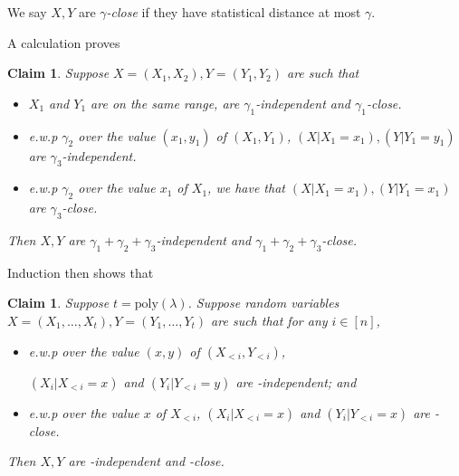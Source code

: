 \documentclass[11pt]{article}
\numberwithin{equation}{section} %
\numberwithin{figure}{section} %
\newtheorem{claim}[thm]{Claim}
\newcommand{\set}[1]{\ensuremath{\left\{#1\right\}}\xspace}
\newcommand{\poly}{\ensuremath{\mathrm{poly}(\lambda)}\xspace}
\begin{document}
We say $X,Y$ are \emph{$\gamma$-close} if they have statistical distance at most $\gamma$.

A calculation proves
\begin{claim}\label{clm:close_to_ind}
 Suppose $X=(X_1,X_2), Y=(Y_1,Y_2)$ are such that 
 \begin{itemize}
 \item $X_1$ and $Y_1$ are on the same range, are $\gamma_1$-independent and $\gamma_1$-close.
  \item 
 e.w.p $\gamma_2$ over the value $(x_1,y_1)$ of $(X_1,Y_1)$, $(X|X_1=x_1), (Y|Y_1 = y_1)$ are $\gamma_3$-independent.
 \item e.w.p $\gamma_2$ over the value $x_1$ of $X_1$, we have that $(X|X_1=x_1), (Y|Y_1=x_1)$ are $\gamma_3$-close.
 \end{itemize}

 Then $X,Y$ are $\gamma_1+\gamma_2+\gamma_3$-independent and $\gamma_1+\gamma_2+\gamma_3$-close.
 \end{claim}

 Induction then shows that
 \begin{claim}\label{clm:neg_close_to_ind}
  Suppose $t=\poly$. Suppose random variables $X=(X_1,\ldots,X_t),Y=(Y_1,\ldots,Y_t)$ are such that
  for any $i\in [n]$,
  
  \begin{itemize}
   \item 
e.w.p \negl over the value $(x,y)$ of $(X_{<i},Y_{<i})$,

  $(X_i|X_{<i}=x)$ and $(Y_i|Y_{<i}=y)$ are \negl-independent;
  and
  \item e.w.p \negl over the value $x$ of $X_{<i}$,
  $(X_i|X_{<i}=x)$ and $(Y_i|Y_{<i}=x)$
  are \negl-close.
  \end{itemize}
  Then $X,Y$ are \negl-independent and \negl-close.
 \end{claim}

% 
\end{document}
